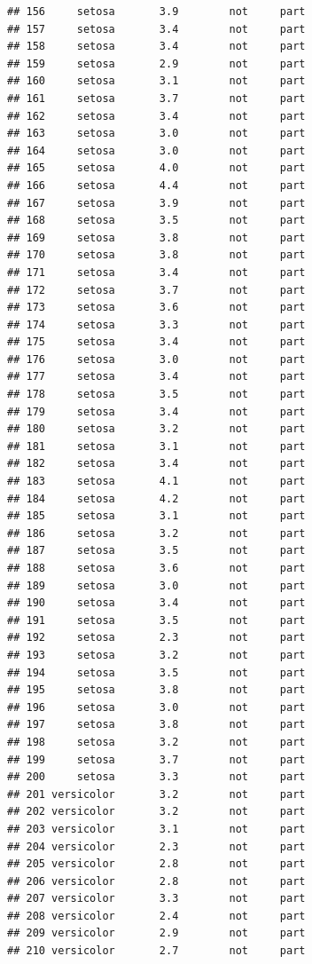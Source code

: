 \documentclass[krantz2]{krantz}\usepackage{knitr}%
\begin{document}
\begin{knitrout}
\begin{kframe}
\begin{verbatim}
## 156     setosa       3.9        not     part
## 157     setosa       3.4        not     part
## 158     setosa       3.4        not     part
## 159     setosa       2.9        not     part
## 160     setosa       3.1        not     part
## 161     setosa       3.7        not     part
## 162     setosa       3.4        not     part
## 163     setosa       3.0        not     part
## 164     setosa       3.0        not     part
## 165     setosa       4.0        not     part
## 166     setosa       4.4        not     part
## 167     setosa       3.9        not     part
## 168     setosa       3.5        not     part
## 169     setosa       3.8        not     part
## 170     setosa       3.8        not     part
## 171     setosa       3.4        not     part
## 172     setosa       3.7        not     part
## 173     setosa       3.6        not     part
## 174     setosa       3.3        not     part
## 175     setosa       3.4        not     part
## 176     setosa       3.0        not     part
## 177     setosa       3.4        not     part
## 178     setosa       3.5        not     part
## 179     setosa       3.4        not     part
## 180     setosa       3.2        not     part
## 181     setosa       3.1        not     part
## 182     setosa       3.4        not     part
## 183     setosa       4.1        not     part
## 184     setosa       4.2        not     part
## 185     setosa       3.1        not     part
## 186     setosa       3.2        not     part
## 187     setosa       3.5        not     part
## 188     setosa       3.6        not     part
## 189     setosa       3.0        not     part
## 190     setosa       3.4        not     part
## 191     setosa       3.5        not     part
## 192     setosa       2.3        not     part
## 193     setosa       3.2        not     part
## 194     setosa       3.5        not     part
## 195     setosa       3.8        not     part
## 196     setosa       3.0        not     part
## 197     setosa       3.8        not     part
## 198     setosa       3.2        not     part
## 199     setosa       3.7        not     part
## 200     setosa       3.3        not     part
## 201 versicolor       3.2        not     part
## 202 versicolor       3.2        not     part
## 203 versicolor       3.1        not     part
## 204 versicolor       2.3        not     part
## 205 versicolor       2.8        not     part
## 206 versicolor       2.8        not     part
## 207 versicolor       3.3        not     part
## 208 versicolor       2.4        not     part
## 209 versicolor       2.9        not     part
## 210 versicolor       2.7        not     part

\end{verbatim}
\end{kframe}
\end{knitrout}
\end{document}
